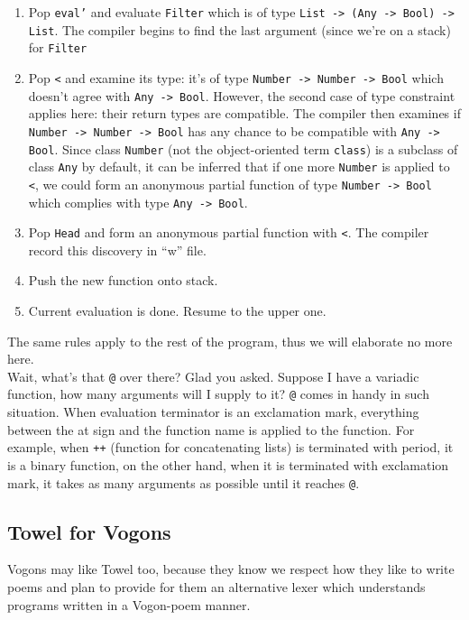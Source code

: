 \documentclass{article}
\begin{document}
\begin{enumerate}
\item Pop \texttt{eval'} and evaluate \texttt{Filter} which is of type \texttt{List -> (Any -> Bool) -> List}. The compiler begins to find the last argument (since we're on a stack) for \texttt{Filter}
\item Pop \texttt{<} and examine its type: it's of type \texttt{Number -> Number -> Bool} which doesn't agree with \texttt{Any -> Bool}. However, the second case of type constraint applies here: their return types are compatible. The compiler then examines if \texttt{Number -> Number -> Bool} has any chance to be compatible with \texttt{Any -> Bool}. Since class \texttt{Number} (not the object-oriented term \texttt{class}) is a subclass of class \texttt{Any} by default, it can be inferred that if one more \texttt{Number} is applied to \texttt{<}, we could form an anonymous partial function of type \texttt{Number -> Bool} which complies with type \texttt{Any -> Bool}.
\item Pop \texttt{Head} and form an anonymous partial function with \texttt{<}. The compiler record this discovery in ``w'' file.
\item Push the new function onto stack.
\item Current evaluation is done. Resume to the upper one.
\end{enumerate}

The same rules apply to the rest of the program, thus we will elaborate no more here.\\

Wait, what's that \texttt{@} over there? Glad you asked. Suppose I have a variadic function, how many arguments will I supply to it? \texttt{@} comes in handy in such situation. When evaluation terminator is an exclamation mark, everything between the at sign and the function name is applied to the function. For example, when \texttt{++} (function for concatenating lists) is terminated with period, it is a binary function, on the other hand, when it is terminated with exclamation mark, it takes as many arguments as possible until it reaches \texttt{@}.

\subsection{Towel for Vogons}

Vogons may like Towel too, because they know we respect how they like to write poems and plan to provide for them an alternative lexer which understands programs written in a Vogon-poem manner.
\end{document}
